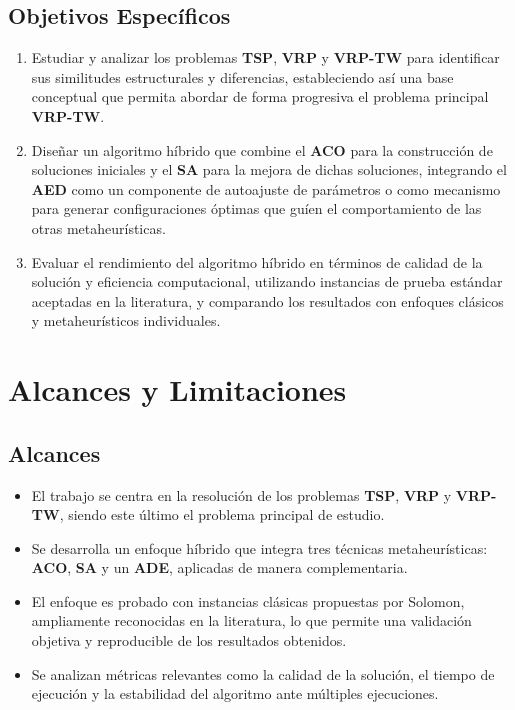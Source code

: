 \documentclass[12pt,titlepage,twoside,openright]{book}
\begin{document}
\subsection{Objetivos Específicos}

\begin{enumerate}
\item Estudiar y analizar los problemas \textbf{TSP}, \textbf{VRP} y \textbf{VRP-TW} para identificar sus similitudes estructurales y diferencias, estableciendo así una base conceptual que permita abordar de forma progresiva el problema principal \textbf{VRP-TW}.

\item Diseñar un algoritmo híbrido que combine el \textbf{ACO} para la construcción de soluciones iniciales y el \textbf{SA} para la mejora de dichas soluciones, integrando el \textbf{AED} como un componente de autoajuste de parámetros o como mecanismo para generar configuraciones óptimas que guíen el comportamiento de las otras metaheurísticas.

\item Evaluar el rendimiento del algoritmo híbrido en términos de calidad de la solución y eficiencia computacional, utilizando instancias de prueba estándar aceptadas en la literatura, y comparando los resultados con enfoques clásicos y metaheurísticos individuales.
\end{enumerate}

\section{Alcances y Limitaciones}

\subsection*{Alcances}

\begin{itemize}
	\item El trabajo se centra en la resolución de los problemas  \textbf{TSP}, \textbf{VRP} y \textbf{VRP-TW}, siendo este último el problema principal de estudio.

	\item Se desarrolla un enfoque híbrido que integra tres técnicas metaheurísticas: \textbf{ACO}, \textbf{SA} y un \textbf{ADE}, aplicadas de manera complementaria.

	\item El enfoque es probado con instancias clásicas propuestas por Solomon, ampliamente reconocidas en la literatura, lo que permite una validación objetiva y reproducible de los resultados obtenidos.

	\item Se analizan métricas relevantes como la calidad de la solución, el tiempo de ejecución y la estabilidad del algoritmo ante múltiples ejecuciones.
\end{itemize}
\end{document}
